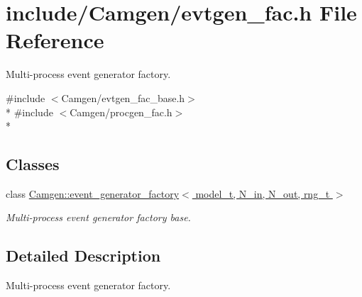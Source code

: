 \hypertarget{a00635}{}\section{include/\+Camgen/evtgen\+\_\+fac.h File Reference}
\label{a00635}


Multi-\/process event generator factory.  


{\ttfamily \#include $<$Camgen/evtgen\+\_\+fac\+\_\+base.\+h$>$}\\*
{\ttfamily \#include $<$Camgen/procgen\+\_\+fac.\+h$>$}\\*
\subsection*{Classes}
\begin{DoxyCompactItemize}
\item 
class \hyperlink{a00213}{Camgen\+::event\+\_\+generator\+\_\+factory$<$ model\+\_\+t, N\+\_\+in, N\+\_\+out, rng\+\_\+t $>$}
\begin{DoxyCompactList}\small\item\em Multi-\/process event generator factory base. \end{DoxyCompactList}\end{DoxyCompactItemize}


\subsection{Detailed Description}
Multi-\/process event generator factory. 

